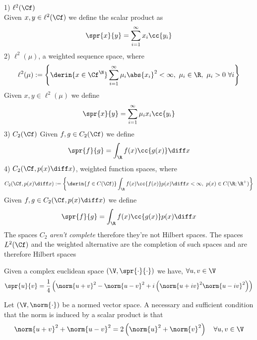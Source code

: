 \documentclass[../mmf.tex]{subfiles}
\begin{document}
\begin{eg}
	1) $\ell^2(\Cf)$\\
	Given $x,y\in\ell^2(\Cf)$ we define the scalar product as
	\begin{equation*}
		\spr{x}{y}=\sum_{i=1}^\infty x_i\cc{y_i}
	\end{equation*}
	2) $\ell^2(\mu)$, a weighted sequence space, where
	\begin{equation*}
		\ell^2(\mu):=\left\{ \derin{x\in\Cf^\N}\sum_{i=1}^\infty\mu_i\abs{x_i}^2<\infty,\ \mu_i\in\R,\ \mu_i>0\ \forall i \right\}
	\end{equation*}
	Given $x,y\in\ell^2(\mu)$ we define
	\begin{equation*}
		\spr{x}{y}=\sum_{i=1}^\infty\mu_ix_i\cc{y_i}
	\end{equation*}
	3) $C_2(\Cf)$
	Given $f,g\in C_2(\Cf)$ we define
	\begin{equation*}
		\spr{f}{g}=\int_\R f(x)\cc{g(x)}\diff x
	\end{equation*}
	4) $C_2(\Cf,p(x)\diff x)$, weighted function spaces, where
	\begin{equation*}
		C_2(\Cf,p(x)\diff x):=\left\{ \derin{f\in C(\Cf)}\int_\R f(x)\cc{f(x)}p(x)\diff x<\infty,\ p(x)\in C(\R;\R^+) \right\}
	\end{equation*}
	Given $f,g\in C_2(\Cf,p(x)\diff x)$ we define
	\begin{equation*}
		\spr{f}{g}=\int_\R f(x)\cc{g(x)}p(x)\diff x
	\end{equation*}
	The spaces $C_2$ \emph{aren't complete} therefore they're not Hilbert spaces. The spaces $L^2(\Cf)$ and the weighted alternative are the completion of such spaces and are therefore Hilbert spaces
\end{eg}
\begin{thm}
	Given a complex euclidean space $(\V,\spr{\cdot}{\cdot})$ we have, $\forall u,v\in\V$
	\begin{equation}
		\spr{u}{v}=\frac{1}{4}\left( \norm{u+v}^2-\norm{u-v}^2+i\left( \norm{u+iv}^2\norm{u-iv}^2 \right) \right)
		\label{eq:polarizationid}
	\end{equation}
\end{thm}
\begin{thm}
	Let $(\V,\norm{\cdot})$ be a normed vector space. A necessary and sufficient condition that the norm is induced by a scalar product is that
	\begin{equation}
		\norm{u+v}^2+\norm{u-v}^2=2\left( \norm{u}^2+\norm{v}^2 \right)\quad\forall u,v\in\V
		\label{eq:parallelogramrule}
	\end{equation}
\end{thm}
\end{document}
